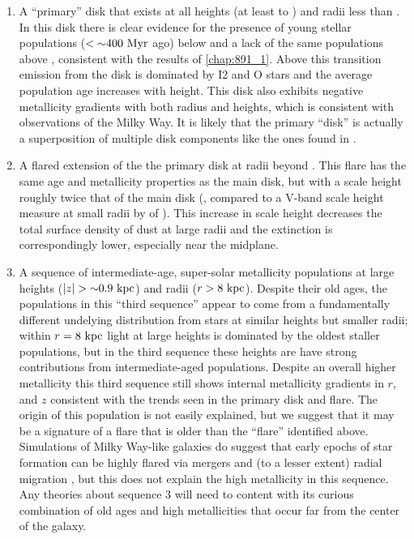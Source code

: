 \begin{enumerate}
  
\item A ``primary'' disk that exists at all heights (at least to
  ) and radii less than . In this disk there
  is clear evidence for the presence of young stellar populations ($<
  {\sim} 400~\mathrm{Myr} $ ago) below  and a lack of the
  same populations above , consistent with the results
  of \ref{chap:891_1}. Above this transition emission from
  the disk is dominated by I2 and O stars and the average population
  age increases with height. This disk also exhibits negative
  metallicity gradients with both radius and heights, which is
  consistent with observations of the Milky Way. It is likely that the
  primary ``disk'' is actually a superposition of multiple disk
  components like the ones found in \citet{Schechtman-Rook13,
    Schechtman-Rook14}.

\item A flared extension of the the primary disk at radii beyond
  . This flare has the same age and metallicity properties
  as the main disk, but with a scale height roughly twice that of the
  main disk (, compared to a V-band scale height
  measure at small radii by \citet{Xilouris99} of
  ). This increase in scale height decreases the total
  surface density of dust at large radii and the extinction is
  correspondingly lower, especially near the midplane.
  
\item A sequence of intermediate-age, super-solar metallicity
  populations at large heights ($|z|> \val{\asim 0.9}{kpc}$) and radii
  ($r>8~\mathrm{kpc} $). Despite their old ages, the populations in this
  ``third sequence'' appear to come from a fundamentally different
  undelying distribution from stars at similar heights but smaller
  radii; within $r=8~\mathrm{kpc} $ light at large heights is dominated
  by the oldest staller populations, but in the third sequence these
  heights are have strong contributions from intermediate-aged
  populations. Despite an overall higher metallicity this third
  sequence still shows internal metallicity gradients in $r$, and $z$
  consistent with the trends seen in the primary disk and flare. The
  origin of this population is not easily explained, but we suggest
  that it may be a signature of a flare that is older than the
  ``flare'' identified above. Simulations of Milky Way-like galaxies
  do suggest that early epochs of star formation can be highly flared
  via mergers and (to a lesser extent) radial migration
  \citep{Martig14b}, but this does not explain the high metallicity in
  this sequence. Any theories about sequence 3 will need to content
  with its curious combination of old ages and high metallicities that
  occur far from the center of the galaxy.

\end{enumerate}

